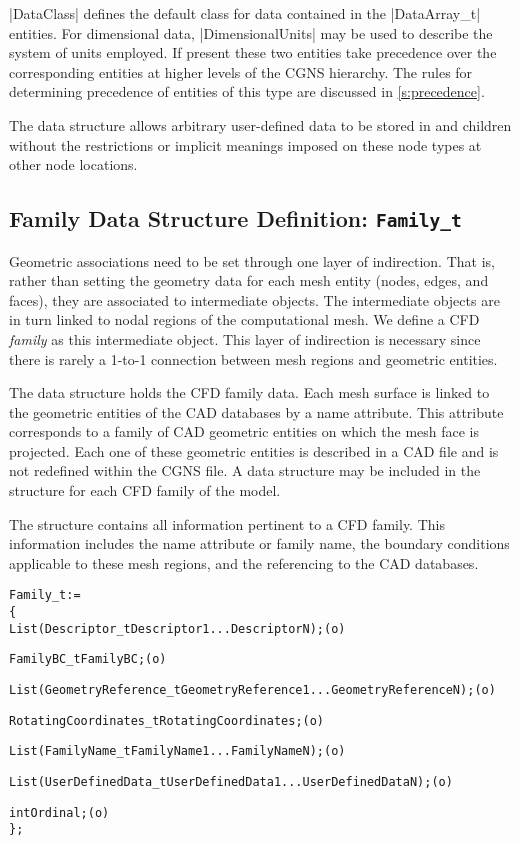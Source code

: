 |DataClass| defines the default class for data contained in the
|DataArray_t| entities.
For dimensional data, |DimensionalUnits| may be used to describe the
system of units employed.
If present these two entities take precedence over the corresponding
entities at higher levels of the CGNS hierarchy.
The rules for determining precedence of entities of this type are
discussed in \autoref{s:precedence}.

The  data structure allows arbitrary
user-defined data to be stored in  and
 children without the restrictions or implicit
meanings imposed on these node types at other node locations.

\subsection{Family Data Structure Definition: \texttt{Family\_t}}
\label{s:Family}

Geometric associations need to be set through one layer of indirection.
That is, rather than setting the geometry data for each mesh entity
(nodes, edges, and faces), they are associated to intermediate objects.
The intermediate objects are in turn linked to nodal regions of the
computational mesh.
We define a CFD \emph{family} as this intermediate object.
This layer of indirection is necessary since there is rarely a 1-to-1
connection between mesh regions and geometric entities.

The  data structure holds the CFD family data.
Each mesh surface is linked to the geometric entities of the CAD databases
by a name attribute.
This attribute corresponds to a family of CAD geometric entities on which
the mesh face is projected.
Each one of these geometric entities is described in a CAD file and is not
redefined within the CGNS file.
A  data structure may be included in the 
structure for each CFD family of the model.

The  structure contains all information pertinent to a
CFD family.
This information includes the name attribute or family name, the
boundary conditions applicable to these mesh regions, and the referencing
to the CAD databases.

\clearpage
\begin{alltt}
  Family\_t :=
    \{
    List( Descriptor\_t Descriptor1 ... DescriptorN ) ;                      (o)

    FamilyBC\_t FamilyBC ;                                                   (o)

    List( GeometryReference\_t GeometryReference1 ... GeometryReferenceN ) ; (o)

    RotatingCoordinates\_t RotatingCoordinates ;                             (o)

    List( FamilyName\_t FamilyName1 ... FamilyNameN ) ;                      (o)

    List( UserDefinedData\_t UserDefinedData1 ... UserDefinedDataN ) ;       (o)

    int Ordinal ;                                                           (o)
    \} ;
\end{alltt}

